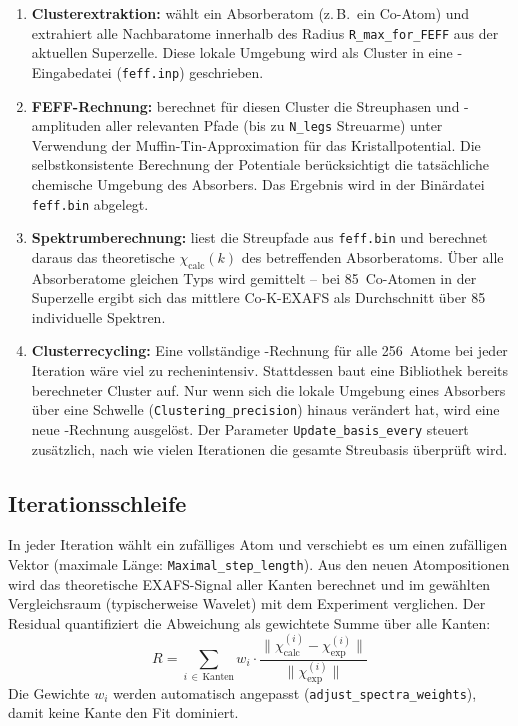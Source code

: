 \begin{enumerate}
  \item \textbf{Clusterextraktion:}
    \evax{} wählt ein Absorberatom (z.\,B.\ ein Co-Atom) und
    extrahiert alle Nachbaratome innerhalb des Radius
    \texttt{R\_max\_for\_FEFF} aus der aktuellen Superzelle.
    Diese lokale Umgebung wird als Cluster in eine \feff{}-Eingabedatei
    (\texttt{feff.inp}) geschrieben.

  \item \textbf{FEFF-Rechnung:}
    \feff{} berechnet für diesen Cluster die Streuphasen und
    -amplituden aller relevanten Pfade (bis zu \texttt{N\_legs}
    Streuarme) unter Verwendung der Muffin-Tin-Approximation für
    das Kristallpotential.
    Die selbstkonsistente Berechnung der Potentiale berücksichtigt
    die tatsächliche chemische Umgebung des Absorbers.
    Das Ergebnis wird in der Binärdatei \texttt{feff.bin} abgelegt.

  \item \textbf{Spektrumberechnung:}
    \evax{} liest die Streupfade aus \texttt{feff.bin} und berechnet
    daraus das theoretische $\chi_\text{calc}(k)$ des betreffenden
    Absorberatoms.
    Über alle Absorberatome gleichen Typs wird gemittelt -- bei
    85~Co-Atomen in der Superzelle ergibt sich das mittlere
    Co-K-EXAFS als Durchschnitt über 85 individuelle Spektren.

  \item \textbf{Clusterrecycling:}
    Eine vollständige \feff{}-Rechnung für alle 256~Atome bei jeder
    Iteration wäre viel zu rechenintensiv.
    Stattdessen baut \evax{} eine Bibliothek bereits berechneter
    Cluster auf.
    Nur wenn sich die lokale Umgebung eines Absorbers über eine
    Schwelle (\texttt{Clustering\_precision}) hinaus verändert hat,
    wird eine neue \feff{}-Rechnung ausgelöst.
    Der Parameter \texttt{Update\_basis\_every} steuert zusätzlich,
    nach wie vielen Iterationen die gesamte Streubasis überprüft wird.
\end{enumerate}

\subsection{Iterationsschleife}

In jeder Iteration wählt \evax{} ein zufälliges Atom und verschiebt
es um einen zufälligen Vektor (maximale Länge:
\texttt{Maximal\_step\_length}).
Aus den neuen Atompositionen wird das theoretische EXAFS-Signal
aller Kanten berechnet und im gewählten Vergleichsraum (typischerweise
Wavelet) mit dem Experiment verglichen.
Der Residual quantifiziert die Abweichung als gewichtete Summe über
alle Kanten:
\begin{equation}
  R = \sum_{i\,\in\,\text{Kanten}} w_i \cdot
      \frac{\|\chi_\text{calc}^{(i)} - \chi_\text{exp}^{(i)}\|}
           {\|\chi_\text{exp}^{(i)}\|}
\end{equation}
Die Gewichte $w_i$ werden automatisch angepasst
(\texttt{adjust\_spectra\_weights}), damit keine Kante den Fit
dominiert.

